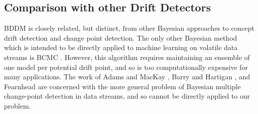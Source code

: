 
\subsection{Comparison with other Drift Detectors}

BDDM is closely related, but distinct, from other Bayesian approaches to concept drift detection and change point detection. The only other Bayesian method which is intended to be directly applied to machine learning on volatile data streams is BCMC \cite{BCMC}. However, this algorithm requires maintaining an ensemble of one model per potential drift point, and so is too computationally expensive for many applications. The work of Adams and MacKay \cite{adams_mackay}, Barry and Hartigan \cite{barry_hartigan}, and Fearnhead \cite{fearnhead} are concerned with the more general problem of Bayesian multiple change-point detection in data streams, and so cannot be directly applied to our problem.

